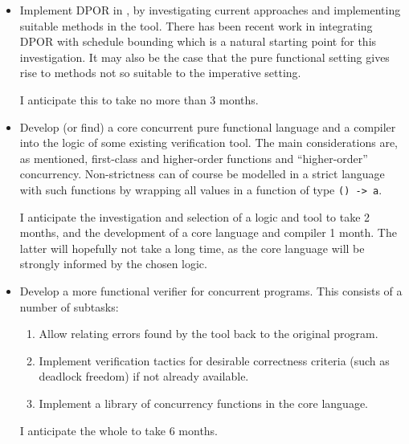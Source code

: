 \begin{itemize}
  \item Implement DPOR in \dejafu{}, by investigating current
    approaches and implementing suitable methods in the tool. There
    has been recent work in integrating DPOR with schedule
    bounding\cite{bpor} which is a natural starting point for this
    investigation. It may also be the case that the pure functional
    setting gives rise to methods not so suitable to the imperative
    setting.

    I anticipate this to take no more than 3 months.

  \item Develop (or find) a core concurrent pure functional language
    and a compiler into the logic of some existing verification
    tool. The main considerations are, as mentioned, first-class and
    higher-order functions and ``higher-order''
    concurrency. Non-strictness can of course be modelled in a strict
    language with such functions by wrapping all values in a function
    of type \verb|() -> a|.

    I anticipate the investigation and selection of a logic and tool
    to take 2 months, and the development of a core language and
    compiler 1 month. The latter will hopefully not take a long time,
    as the core language will be strongly informed by the chosen
    logic.

  \item Develop a more functional verifier for concurrent
    programs. This consists of a number of subtasks:

    \begin{enumerate}
      \item Allow relating errors found by the tool back to the
        original program.
      \item Implement verification tactics for desirable correctness
        criteria (such as deadlock freedom) if not already available.
      \item Implement a library of concurrency functions in the core
        language.
    \end{enumerate}

    I anticipate the whole to take 6 months.
\end{itemize}

